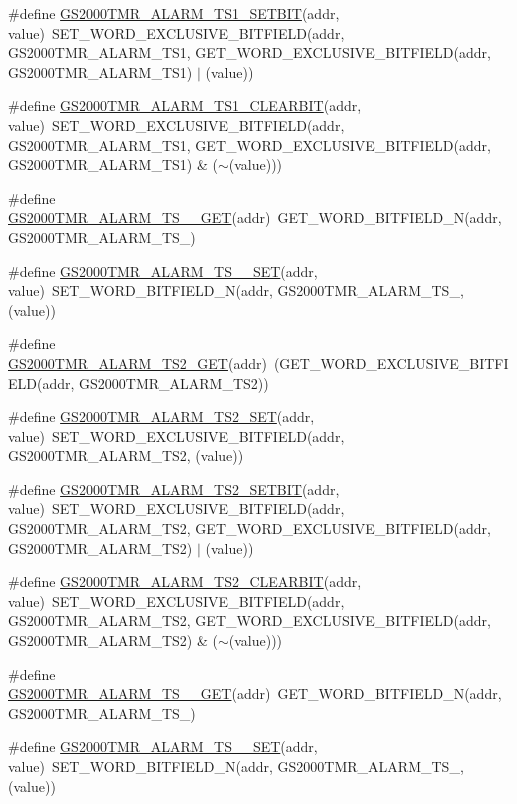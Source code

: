 \begin{DoxyCompactItemize}
\item 
\#define \hyperlink{a00555_aa81e0fb5df83d0a7868cc682129fb9c4}{GS2000TMR\_\-ALARM\_\-TS1\_\-SETBIT}(addr, value)~SET\_\-WORD\_\-EXCLUSIVE\_\-BITFIELD(addr, GS2000TMR\_\-ALARM\_\-TS1, GET\_\-WORD\_\-EXCLUSIVE\_\-BITFIELD(addr, GS2000TMR\_\-ALARM\_\-TS1) $|$ (value))
\item 
\#define \hyperlink{a00555_a6b4976c1bdba70acfe31d83465adcc96}{GS2000TMR\_\-ALARM\_\-TS1\_\-CLEARBIT}(addr, value)~SET\_\-WORD\_\-EXCLUSIVE\_\-BITFIELD(addr, GS2000TMR\_\-ALARM\_\-TS1, GET\_\-WORD\_\-EXCLUSIVE\_\-BITFIELD(addr, GS2000TMR\_\-ALARM\_\-TS1) \& ($\sim$(value)))
\item 
\#define \hyperlink{a00555_aef15b549130b082669c7ebf10dfa78b3}{GS2000TMR\_\-ALARM\_\-TS\_\_\-GET}(addr)~GET\_\-WORD\_\-BITFIELD\_\-N(addr, GS2000TMR\_\-ALARM\_\-TS\_)
\item 
\#define \hyperlink{a00555_a81a4a5c05841fcf6a70f8f867028e922}{GS2000TMR\_\-ALARM\_\-TS\_\_\-SET}(addr, value)~SET\_\-WORD\_\-BITFIELD\_\-N(addr, GS2000TMR\_\-ALARM\_\-TS\_, (value))
\item 
\#define \hyperlink{a00555_aa58c0350a1c5859aa245fb72c5c1b320}{GS2000TMR\_\-ALARM\_\-TS2\_\-GET}(addr)~(GET\_\-WORD\_\-EXCLUSIVE\_\-BITFIELD(addr, GS2000TMR\_\-ALARM\_\-TS2))
\item 
\#define \hyperlink{a00555_a49074d5c35b278dc66e6d5c2a3eb494e}{GS2000TMR\_\-ALARM\_\-TS2\_\-SET}(addr, value)~SET\_\-WORD\_\-EXCLUSIVE\_\-BITFIELD(addr, GS2000TMR\_\-ALARM\_\-TS2, (value))
\item 
\#define \hyperlink{a00555_a09daccb8883a9262263b4f094f5257a5}{GS2000TMR\_\-ALARM\_\-TS2\_\-SETBIT}(addr, value)~SET\_\-WORD\_\-EXCLUSIVE\_\-BITFIELD(addr, GS2000TMR\_\-ALARM\_\-TS2, GET\_\-WORD\_\-EXCLUSIVE\_\-BITFIELD(addr, GS2000TMR\_\-ALARM\_\-TS2) $|$ (value))
\item 
\#define \hyperlink{a00555_a7fc1255e2b159bb901b7d2bc185fd211}{GS2000TMR\_\-ALARM\_\-TS2\_\-CLEARBIT}(addr, value)~SET\_\-WORD\_\-EXCLUSIVE\_\-BITFIELD(addr, GS2000TMR\_\-ALARM\_\-TS2, GET\_\-WORD\_\-EXCLUSIVE\_\-BITFIELD(addr, GS2000TMR\_\-ALARM\_\-TS2) \& ($\sim$(value)))
\item 
\#define \hyperlink{a00555_a003e262f4563fe5103f5faa62e2312b0}{GS2000TMR\_\-ALARM\_\-TS\_\_\-GET}(addr)~GET\_\-WORD\_\-BITFIELD\_\-N(addr, GS2000TMR\_\-ALARM\_\-TS\_)
\item 
\#define \hyperlink{a00555_a384b0286f5bf55dc60231498867d0c50}{GS2000TMR\_\-ALARM\_\-TS\_\_\-SET}(addr, value)~SET\_\-WORD\_\-BITFIELD\_\-N(addr, GS2000TMR\_\-ALARM\_\-TS\_, (value))

\end{DoxyCompactItemize}

